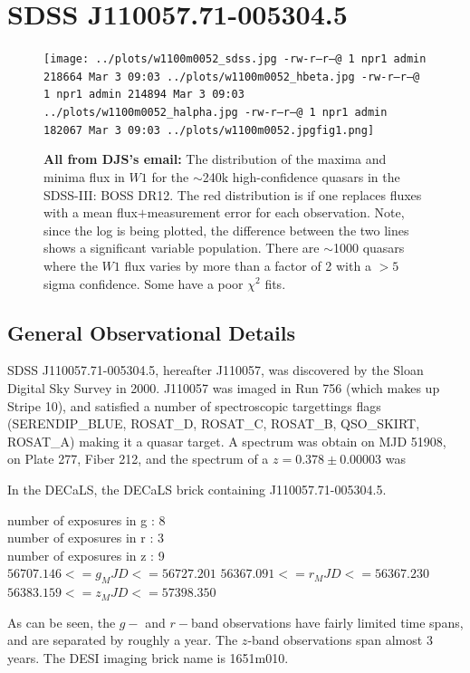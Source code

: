 \documentclass{emulateapj}
\begin{document}
\section{SDSS J110057.71-005304.5}

\begin{figure}
  \texttt{[image: ../plots/w1100m0052\_sdss.jpg
-rw-r--r--@ 1 npr1  admin  218664 Mar  3 09:03 ../plots/w1100m0052\_hbeta.jpg
-rw-r--r--@ 1 npr1  admin  214894 Mar  3 09:03 ../plots/w1100m0052\_halpha.jpg
-rw-r--r--@ 1 npr1  admin  182067 Mar  3 09:03 ../plots/w1100m0052.jpgfig1.png]}
  \centering
  \caption[]{
    {\bf All from DJS's email:} The distribution of the maxima and
    minima flux in $W1$ for the $\sim$240k high-confidence quasars in the
    SDSS-III: BOSS DR12.  The red distribution is if one replaces fluxes
    with a mean flux$+$measurement error for each observation.  Note,
    since the log is being plotted, the difference between the two lines
    shows a significant variable population.  There are $\sim$1000 quasars
    where the $W1$ flux varies by more than a factor of 2 with a $>5$
    sigma confidence.  Some have a poor $\chi{^2}$ fits.
  }
 \label{fig:maxminflux}
\end{figure}

\subsection{General Observational Details}
SDSS J110057.71-005304.5, hereafter J110057, was discovered by 
the Sloan Digital Sky Survey in 2000. 
 J110057 was imaged in Run 756 (which makes up Stripe 10), 
and satisfied a number of spectroscopic targettings flags
(SERENDIP\_BLUE, ROSAT\_D,  ROSAT\_C,  ROSAT\_B, QSO\_SKIRT, ROSAT\_A)
making it a quasar target. A spectrum was obtain on MJD 51908, on Plate 
277, Fiber 212, and the spectrum of a $z=0.378\pm0.00003$ was

In the DECaLS, the 
DECaLS brick containing J110057.71-005304.5.

number of exposures in g : 8\\
number of exposures in r : 3\\
number of exposures in z : 9 \\

$56707.146 <= g_MJD <= 56727.201$
$56367.091 <= r_MJD <= 56367.230$
$56383.159 <= z_MJD <= 57398.350$

As can be seen, the $g-$ and $r-$band observations have fairly limited
time spans, and are separated by roughly a year. The $z$-band observations
span almost 3 years.  The DESI imaging brick name is 1651m010. 
\end{document}
